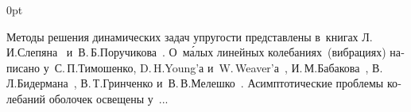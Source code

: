 \begin{changemargin}{\parindent}{0pt}
\fontsize{10}{12}\selectfont

\begin{otherlanguage}{russian}

Методы решения динамических задач упругости представлены в~книгах
Л.\,И.\;Слепяна~\cite{slepyan-nonstationeryelasticwaves}
и~В.\,Б.\;Поручикова~\cite{poruchikov-dynamicelasticity}.
О~м\'{а}лых линейных колебаниях~(вибрациях) написано
у~С.\,П.\;Тимошенко, D.\,H.\:Young’а и~W.\,Weaver’а~\cite{timoshenko.young.weaver},
И.\,М.\;Бабакова~\cite{babakov-theoryofoscillations},
В.\,Л.\;Бидермана~\cite{biderman-oscillations},
В.\,Т.\;Гринченко и~В.\,В.\;Мелешко~\cite{grinchenko.meleshko}.
Асимптотические проблемы колебаний оболочек освещены
у~...

\end{otherlanguage}

\end{changemargin}
